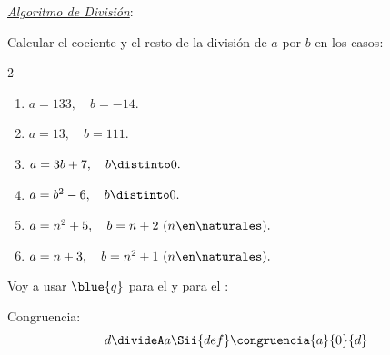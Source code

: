 \textit{\underline{Algoritmo de División}}:\par

\begin{enunciado}{\ejercicio}
  Calcular el cociente y el resto de la división de $a$ por $b$ en los casos:
  \begin{multicols}{2}
    \begin{enumerate}[label=\alph*)]
      \item $a =133,\quad b = -14.$
      \item $a =13,\quad b = 111.$
      \item $a =3b+7,    \quad b \distinto 0.$
      \item $a = b^2 - 6,\quad b \distinto 0.$
      \item $a = n^2 + 5,\quad b = n+2 \ (n \en \naturales).$
      \item $a = n + 3,   \quad b = n^2 + 1 \ (n \en \naturales).$
    \end{enumerate}
  \end{multicols}
\end{enunciado}

Voy a usar $\blue{q}$ para el  y  para el :

Congruencia:
$$
  d \divideA a
  \Sii{def} \congruencia{a}{0}{d}
$$

